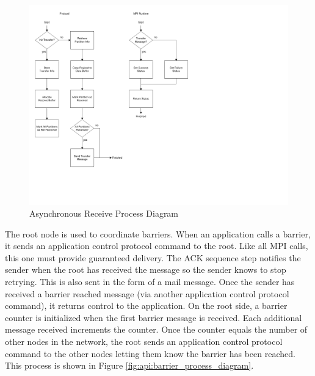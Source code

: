 \begin{figure}[ptb]
	\begin{centering}
		\includegraphics{API/Figures/api-irecv_process_diagram.pdf}
		\caption{Asynchronous Receive Process Diagram}
		\label{fig:api:irecv_process_diagram}
	\end{centering}
\end{figure}

The root node is used to coordinate barriers. When an application calls a barrier, it sends an application control protocol command to the root. Like all MPI calls, this one must provide guaranteed delivery. The ACK sequence step notifies the sender when the root has received the message so the sender knows to stop retrying. This is also sent in the form of a mail message. Once the sender has received a barrier reached message (via another application control protocol command), it returns control to the application. On the root side, a barrier counter is initialized when the first barrier message is received. Each additional message received increments the counter. Once the counter equals the number of other nodes in the network, the root sends an application control protocol command to the other nodes letting them know the barrier has been reached. This process is shown in Figure \ref{fig:api:barrier_process_diagram}.

